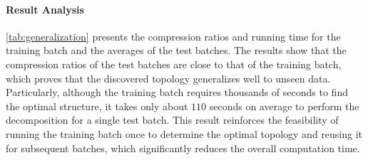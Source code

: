 \paragraph{Result Analysis}
\cref{tab:generalization} presents the compression ratios and running time for the training batch and the averages of the test batches.
%
The results show that the compression ratios of the test batches are close to that of the training batch, which proves that the discovered topology generalizes well to unseen data.
%
Particularly, although the training batch requires thousands of seconds to find the optimal structure, it takes only about $110$ seconds on average to perform the decomposition for a single test batch.
%
This result reinforces the feasibility of running the training batch once to determine the optimal topology and reusing it for subsequent batches, which significantly reduces the overall computation time.